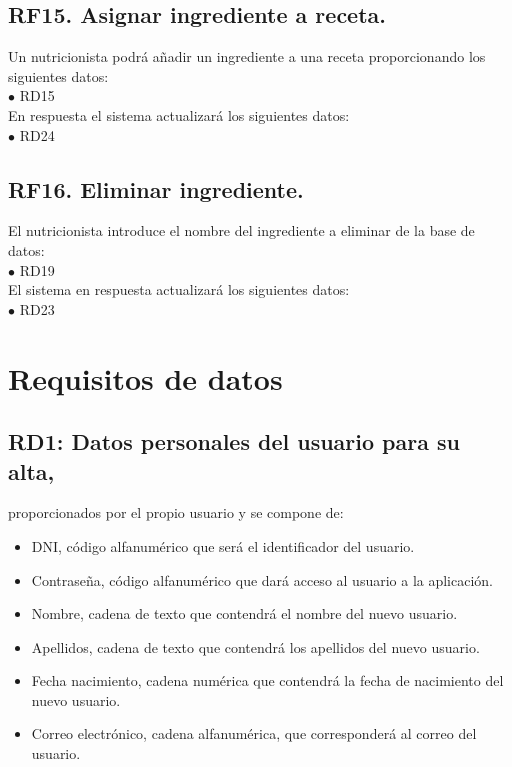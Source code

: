 \documentclass[12pt,letterpaper]{article}
\begin{document}
{\subsection{RF15. Asignar ingrediente a receta.} Un nutricionista podrá añadir un ingrediente a una receta proporcionando los siguientes datos:
\\ $\bullet$	RD15\\ 
En respuesta el sistema actualizará los siguientes datos:
\\ $\bullet$	RD24\\ 

\subsection{RF16. Eliminar ingrediente.}
El nutricionista introduce el nombre del ingrediente a eliminar de la base de datos:
\\ $\bullet$	RD19\\ 
El sistema en respuesta actualizará los siguientes datos:
\\ $\bullet$	RD23\\
} 

\section{Requisitos de datos}
\subsection{RD1: Datos personales del usuario para su alta,} proporcionados por el propio usuario y se compone de:
\begin{itemize}
\item DNI, código alfanumérico que será el identificador del usuario.
\item Contraseña, código alfanumérico que dará acceso al usuario a la aplicación.
\item Nombre, cadena de texto que contendrá el nombre del nuevo usuario. 
\item Apellidos, cadena de texto que contendrá los apellidos del nuevo usuario.
\item Fecha nacimiento, cadena numérica que contendrá la fecha de nacimiento del nuevo usuario.
\item Correo electrónico, cadena alfanumérica, que corresponderá al correo del usuario.
\end{itemize}
\end{document}
